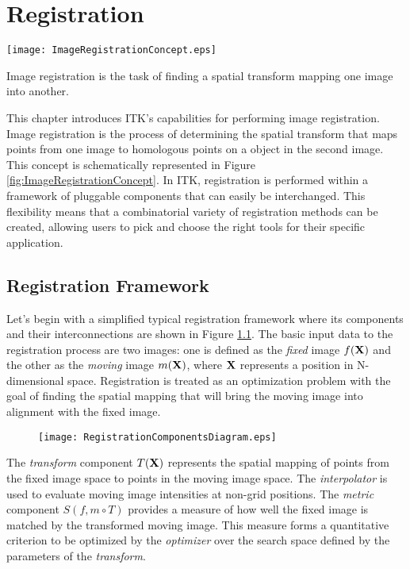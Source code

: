 \chapter{Registration}

\begin{floatingfigure}[rlp]{8cm}
  \centering
  \texttt{[image: ImageRegistrationConcept.eps]}
  \caption[Image Registration Concept]{Image registration is the task of
finding a spatial transform mapping one image into
another.\label{fig:ImageRegistrationConcept}}
\end{floatingfigure}

This chapter introduces ITK's capabilities for performing image
registration. Image registration is the process of determining the spatial
transform that maps points from one image to homologous points on a object in
the second image. This concept is schematically represented in Figure
\ref{fig:ImageRegistrationConcept}. In ITK, registration is performed within
a framework of pluggable components that can easily be interchanged.  This
flexibility means that a combinatorial variety of registration methods can be
created, allowing users to pick and choose the right tools for their specific
application.


\section{Registration Framework}
Let's begin with a simplified typical registration framework where its components
and their interconnections are shown in Figure \ref{fig:RegistrationComponents}.
The basic input data to the registration process are two images: one is defined
as the \emph{fixed} image $f(\bf{X})$ and the other as the \emph{moving} image
$m(\bf{X})$, where $\bf{X}$ represents a position in N-dimensional space.
Registration is treated as an optimization problem with the goal of finding the
spatial mapping that will bring the moving image into alignment with the fixed image.

\begin{figure}
\centering
\texttt{[image: RegistrationComponentsDiagram.eps]}
\label{fig:RegistrationComponents}
\end{figure}

The \emph{transform} component $T(\bf{X})$ represents the spatial mapping of
points from the fixed image space to points in the moving image space. The
\emph{interpolator} is used to evaluate moving image intensities at non-grid
positions. The \emph{metric} component $S(f,m \circ T)$ provides a measure of
how well the fixed image is matched by the transformed moving image. This
measure forms a quantitative criterion to be optimized by the
\emph{optimizer} over the search space defined by the parameters of the
\emph{transform}.

